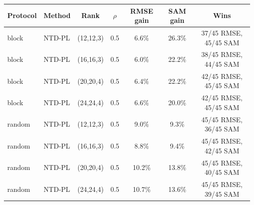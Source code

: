 \begin{tabular}{@{}l l c c c c c@{}}
\toprule
Protocol & Method & Rank & $\rho$ & RMSE gain & SAM gain & Wins\\
\midrule
block & NTD-PL & (12,12,3) & 0.5 & 6.6\% & 26.3\% & 37/45 RMSE, 45/45 SAM\\
block & NTD-PL & (16,16,3) & 0.5 & 6.0\% & 22.2\% & 38/45 RMSE, 44/45 SAM\\
block & NTD-PL & (20,20,4) & 0.5 & 6.4\% & 22.2\% & 42/45 RMSE, 45/45 SAM\\
block & NTD-PL & (24,24,4) & 0.5 & 6.6\% & 20.0\% & 42/45 RMSE, 45/45 SAM\\
random & NTD-PL & (12,12,3) & 0.5 & 9.0\% & 9.3\% & 45/45 RMSE, 36/45 SAM\\
random & NTD-PL & (16,16,3) & 0.5 & 8.8\% & 9.4\% & 45/45 RMSE, 42/45 SAM\\
random & NTD-PL & (20,20,4) & 0.5 & 10.2\% & 13.8\% & 45/45 RMSE, 40/45 SAM\\
random & NTD-PL & (24,24,4) & 0.5 & 10.7\% & 13.6\% & 45/45 RMSE, 39/45 SAM\\
\bottomrule
\end{tabular}
